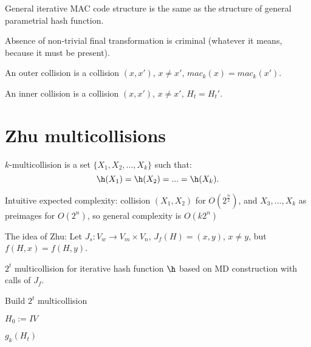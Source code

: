 \begin{remark}
    General iterative MAC code structure is the same as the structure of
    general parametrial hash function.
\end{remark}

\begin{remark}
    Absence of non-trivial final transformation is criminal
    (whatever it means, because it must be present).
\end{remark}

\begin{definition}
    An outer collision is a collision $(x, x')$, $x \neq x'$, $mac_k(x) = mac_k(x')$.
\end{definition}

\begin{definition}
    An inner collision is a collision $(x, x')$, $x \neq x'$, $H_t = H_t'$.
\end{definition}

\section{Zhu multicollisions}

\begin{definition}[$k$-multicollision]
    $k$-multicollision is a set $\{X_1, X_2, ..., X_k\}$ such that:
    \begin{equation*}
        \h(X_1) = \h(X_2) = ... = \h(X_k).
    \end{equation*}
\end{definition}

Intuitive expected complexity: collision $(X_1, X_2)$ for $O(2^{\frac{n}{2}})$,
and $X_3, ..., X_k$ as preimages for $O(2^n)$, so general complexity is $O(k 2^n)$

The idea of Zhu: Let $J_s : V_w \rightarrow V_m \times V_n$, $J_f(H) = (x, y)$,
$x \neq y$, but $f(H, x) = f(H, y)$.

\begin{theorem}
    $2^t$ multicollision for iterative hash function $\h$ based on MD construction
    with calls of $J_f$.
\end{theorem}

\begin{algorithm2e}[ht]
    \caption{Build $2^t$ multicollision}
    \label{alg:build_multicollision}
    

    $H_0 := IV$\;
    
    \Return $g_k(H_t)$\;
\end{algorithm2e}

